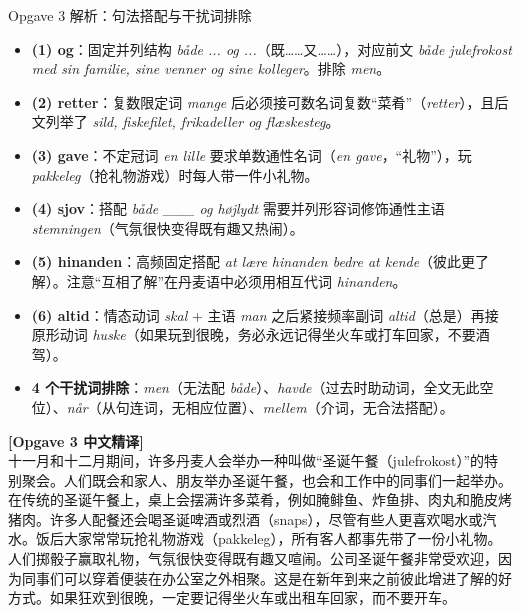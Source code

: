 \begin{tipbox}{Opgave 3 解析：句法搭配与干扰词排除}
\small
\begin{itemize}
  \item \textbf{(1) og}：固定并列结构 \textit{både ... og ...}（既……又……），对应前文 \textit{både julefrokost med sin familie, sine venner og sine kolleger}。排除 \textit{men}。
  \item \textbf{(2) retter}：复数限定词 \textit{mange} 后必须接可数名词复数“菜肴”（\textit{retter}），且后文列举了 \textit{sild, fiskefilet, frikadeller og flæskesteg}。
  \item \textbf{(3) gave}：不定冠词 \textit{en lille} 要求单数通性名词（\textit{en gave}，“礼物”），玩 \textit{pakkeleg}（抢礼物游戏）时每人带一件小礼物。
  \item \textbf{(4) sjov}：搭配 \textit{både \_\_\_ og højlydt} 需要并列形容词修饰通性主语 \textit{stemningen}（气氛很快变得既有趣又热闹）。
  \item \textbf{(5) hinanden}：高频固定搭配 \textit{at lære hinanden bedre at kende}（彼此更了解）。注意“互相了解”在丹麦语中必须用相互代词 \textit{hinanden}。
  \item \textbf{(6) altid}：情态动词 \textit{skal} + 主语 \textit{man} 之后紧接频率副词 \textit{altid}（总是）再接原形动词 \textit{huske}（如果玩到很晚，务必永远记得坐火车或打车回家，不要酒驾）。
  \item \textbf{4 个干扰词排除}：\textit{men}（无法配 \textit{både}）、\textit{havde}（过去时助动词，全文无此空位）、\textit{når}（从句连词，无相应位置）、\textit{mellem}（介词，无合法搭配）。
\end{itemize}
\end{tipbox}

\begin{transbox}
\small
\textbf{\color{NCDTeal}[Opgave 3 中文精译]}\\
十一月和十二月期间，许多丹麦人会举办一种叫做“圣诞午餐（julefrokost）”的特别聚会。人们既会和家人、朋友举办圣诞午餐，也会和工作中的同事们一起举办。在传统的圣诞午餐上，桌上会摆满许多菜肴，例如腌鲱鱼、炸鱼排、肉丸和脆皮烤猪肉。许多人配餐还会喝圣诞啤酒或烈酒（snaps），尽管有些人更喜欢喝水或汽水。饭后大家常常玩抢礼物游戏（pakkeleg），所有客人都事先带了一份小礼物。人们掷骰子赢取礼物，气氛很快变得既有趣又喧闹。公司圣诞午餐非常受欢迎，因为同事们可以穿着便装在办公室之外相聚。这是在新年到来之前彼此增进了解的好方式。如果狂欢到很晚，一定要记得坐火车或出租车回家，而不要开车。
\end{transbox}

